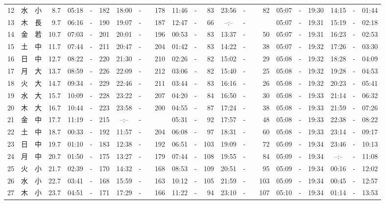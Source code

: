 \documentclass[12pt,a4j]{jsarticle}
\begin{document}
\begin{table}[htbp]
\begin{center}
{\begin{tabular}{|rc|cr|ccrccr|ccrccr|ccc|ccc|}
12 & 水 & 小 &  8.7 &  05:18 &-& 182 &  18:00 &-& 178 &  11:46 &-&  83 &  23:56 &-&  82 & 05:07 & -& 19:30 & 14:15 & -& 01:44 \\
13 & 木 & 長 &  9.7 &  06:16 &-& 190 &  19:07 &-& 187 &  12:47 &-&  66 &  --:-- &-&~~~~~ & 05:07 & -& 19:31 & 15:19 & -& 02:18 \\
14 & 金 & 若 & 10.7 &  07:03 &-& 201 &  20:01 &-& 196 &  00:53 &-&  83 &  13:37 &-&  50 & 05:07 & -& 19:31 & 16:23 & -& 02:53 \\
15 & 土 & 中 & 11.7 &  07:44 &-& 211 &  20:47 &-& 204 &  01:42 &-&  83 &  14:22 &-&  38 & 05:07 & -& 19:32 & 17:26 & -& 03:30 \\
16 & 日 & 中 & 12.7 &  08:22 &-& 220 &  21:30 &-& 210 &  02:26 &-&  82 &  15:02 &-&  29 & 05:08 & -& 19:32 & 18:28 & -& 04:09 \\
17 & 月 & 大 & 13.7 &  08:59 &-& 226 &  22:09 &-& 212 &  03:06 &-&  82 &  15:40 &-&  25 & 05:08 & -& 19:32 & 19:28 & -& 04:53 \\
18 & 火 & 大 & 14.7 &  09:34 &-& 229 &  22:46 &-& 211 &  03:44 &-&  83 &  16:16 &-&  26 & 05:08 & -& 19:32 & 20:23 & -& 05:41 \\
19 & 水 & 大 & 15.7 &  10:09 &-& 228 &  23:22 &-& 207 &  04:20 &-&  84 &  16:50 &-&  30 & 05:08 & -& 19:33 & 21:14 & -& 06:32 \\
20 & 木 & 大 & 16.7 &  10:44 &-& 223 &  23:58 &-& 200 &  04:55 &-&  87 &  17:24 &-&  38 & 05:08 & -& 19:33 & 21:59 & -& 07:26 \\
21 & 金 & 中 & 17.7 &  11:19 &-& 215 &  --:-- &-&~~~~~ &  05:31 &-&  92 &  17:57 &-&  48 & 05:08 & -& 19:33 & 22:38 & -& 08:22 \\
22 & 土 & 中 & 18.7 &  00:33 &-& 192 &  11:57 &-& 204 &  06:08 &-&  97 &  18:31 &-&  60 & 05:08 & -& 19:33 & 23:14 & -& 09:17 \\
23 & 日 & 中 & 19.7 &  01:10 &-& 183 &  12:38 &-& 192 &  06:51 &-& 103 &  19:09 &-&  72 & 05:09 & -& 19:34 & 23:46 & -& 10:13 \\
24 & 月 & 中 & 20.7 &  01:50 &-& 175 &  13:27 &-& 179 &  07:44 &-& 108 &  19:55 &-&  84 & 05:09 & -& 19:34 & --:-- & -& 11:08 \\
25 & 火 & 小 & 21.7 &  02:39 &-& 170 &  14:32 &-& 168 &  08:53 &-& 109 &  20:51 &-&  95 & 05:09 & -& 19:34 & 00:16 & -& 12:02 \\
26 & 水 & 小 & 22.7 &  03:41 &-& 168 &  15:59 &-& 163 &  10:12 &-& 105 &  21:59 &-& 103 & 05:09 & -& 19:34 & 00:45 & -& 12:57 \\
27 & 木 & 小 & 23.7 &  04:51 &-& 171 &  17:29 &-& 166 &  11:22 &-&  94 &  23:10 &-& 107 & 05:10 & -& 19:34 & 01:14 & -& 13:53 \\

\end{tabular}}
\end{center}
\end{table}
\end{document}
